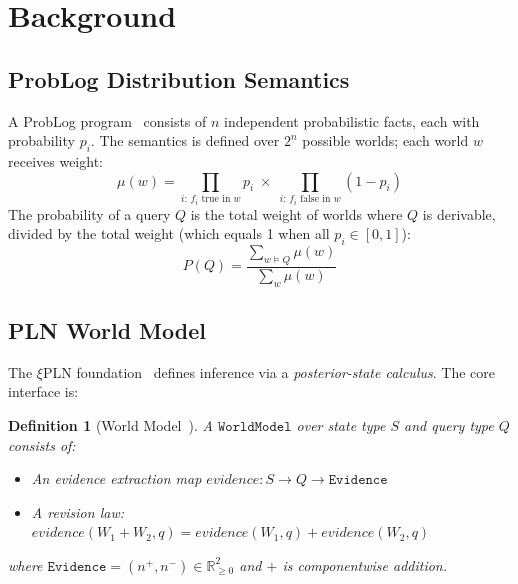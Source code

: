 \documentclass[]{article}
\newtheorem{definition}[theorem]{Definition}
\newcommand{\xiPLN}{\texorpdfstring{$\xi$}{xi}\textup{PLN}}
\newcommand{\ty}[1]{\ensuremath{\mathtt{#1}}}
\newcommand{\Evidence}{\ty{Evidence}}
\newcommand{\WorldModel}{\ty{WorldModel}}
\newcommand{\nplus}{\ensuremath{n^{+}}}
\newcommand{\nminus}{\ensuremath{n^{-}}}
\begin{document}
\section{Background}
\label{sec:background}

\subsection{ProbLog Distribution Semantics}

A ProbLog program~\cite{DeRaedt2007ProbLog} consists of $n$ independent probabilistic
facts, each with probability $p_i$.  The semantics is defined over $2^n$ possible
worlds; each world $w$ receives weight:
\begin{equation}
  \mu(w) = \prod_{i:\, f_i \text{ true in } w} p_i \;\times\;
           \prod_{i:\, f_i \text{ false in } w} (1 - p_i)
  \label{eq:world-weight}
\end{equation}
The probability of a query $Q$ is the total weight of worlds where $Q$ is derivable,
divided by the total weight (which equals 1 when all $p_i \in [0,1]$):
\begin{equation}
  P(Q) = \frac{\sum_{w \models Q} \mu(w)}{\sum_w \mu(w)}
  \label{eq:query-prob}
\end{equation}

\subsection{PLN World Model}

The \xiPLN{} foundation~\cite{xiPLN2026} defines inference via a
\emph{posterior-state calculus}.  The core interface is:

\begin{definition}[World Model~\cite{xiPLN2026}]
A \WorldModel{} over state type $S$ and query type $Q$ consists of:
\begin{itemize}
\item An \emph{evidence extraction} map $\mathit{evidence} : S \to Q \to \Evidence$
\item A \emph{revision law}: $\mathit{evidence}(W_1 + W_2, q) = \mathit{evidence}(W_1, q) + \mathit{evidence}(W_2, q)$
\end{itemize}
where $\Evidence = (\nplus, \nminus) \in \mathbb{R}_{\geq 0}^2$ and $+$ is componentwise addition.
\end{definition}
\end{document}
